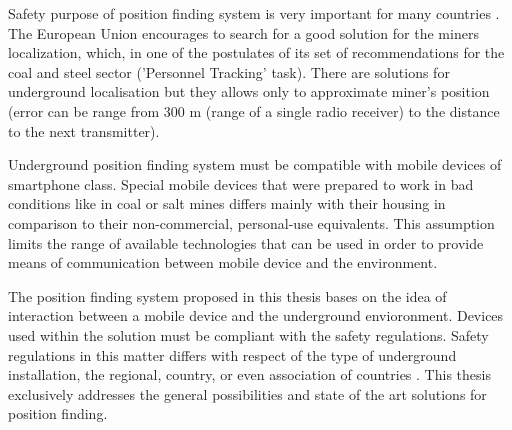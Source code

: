 \documentclass[../main.tex]{subfiles}
\begin{document}
Safety purpose of position finding system is very important for many countries \cite{positioning_tests}. The European Union encourages to search for a good solution for the miners localization, which, in one of the postulates of its set of recommendations for the coal and steel sector ('Personnel Tracking' task). There are solutions for underground localisation but they allows only to approximate miner's position (error can be range from 300 m (range of a single radio receiver) to the distance to the next transmitter).

Underground position finding system must be compatible with mobile devices of smartphone class. Special mobile devices that were prepared to work in bad conditions like in coal or salt mines differs mainly with their housing in comparison to their non-commercial, personal-use equivalents. This assumption limits the range of available technologies that can be used in order to provide means of communication between mobile device and the environment.

The position finding system proposed in this thesis bases on the idea of interaction between a mobile device and the underground envioronment. Devices used within the solution must be compliant with the safety regulations. Safety regulations in this matter differs with respect of the type of underground installation, the regional, country, or even association of countries \cite{Thesis_CM}. This thesis exclusively addresses the general possibilities and state of the art solutions for position finding.
\end{document}

